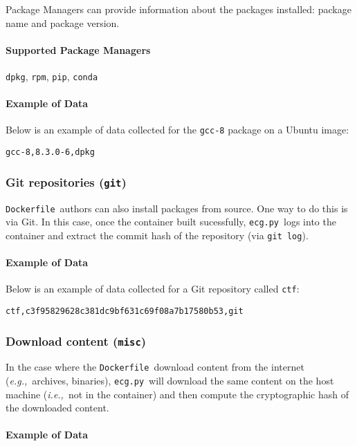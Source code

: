 \documentclass{article}
\newcommand{\dfile}{\texttt{Dockerfile}}
\newcommand{\ecg}{\texttt{ecg.py}}
\newcommand{\eg}{\emph{e.g.,}}
\newcommand{\ie}{\emph{i.e.,}}
\begin{document}
Package Managers can provide information about the packages installed: package name and package version.

\paragraph{Supported Package Managers} \texttt{dpkg}, \texttt{rpm}, \texttt{pip}, \texttt{conda}

\paragraph{Example of Data}

Below is an example of data collected for the \texttt{gcc-8} package on a Ubuntu image:

\begin{lstlisting}
gcc-8,8.3.0-6,dpkg
\end{lstlisting}

\subsubsection{Git repositories (\texttt{git})}

\dfile\ authors can also install packages from source.
One way to do this is via Git.
In this case, once the container built sucessfully, \ecg\ logs into the container and extract the commit hash of the repository (via \texttt{git log}).

\paragraph{Example of Data}

Below is an example of data collected for a Git repository called \texttt{ctf}:

\begin{lstlisting}
ctf,c3f95829628c381dc9bf631c69f08a7b17580b53,git
\end{lstlisting}

\subsubsection{Download content (\texttt{misc})}

In the case where the \dfile\ download content from the internet (\eg\ archives, binaries), \ecg\ will download the same content on the host machine (\ie\ not in the container) and then compute the cryptographic hash of the downloaded content.

\paragraph{Example of Data}
\end{document}
